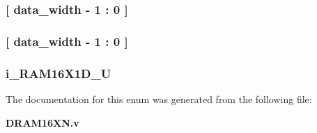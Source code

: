 \subsubsection[{O\-\_\-\-D\-A\-T\-A\-\_\-\-O\-U\-T\-\_\-\-D\-P}]{ {\bfseries \textcolor{vhdlchar}{[}\textcolor{vhdlchar}{ }{\bfseries {\bf data\-\_\-width}} \textcolor{vhdlchar}{-\/} \textcolor{vhdldigit}{1} \textcolor{vhdlchar}{ }\textcolor{vhdlchar}{\-:}\textcolor{vhdlchar}{ } \textcolor{vhdldigit}{0} \textcolor{vhdlchar}{ }\textcolor{vhdlchar}{]}\textcolor{vhdlchar}{ }} \hspace{0.3cm}}\label{enum1_d_r_a_m16_x_n_ad07ac2280a8fc60dfbb13bd438230070}
\subsubsection[{O\-\_\-\-D\-A\-T\-A\-\_\-\-O\-U\-T}]{ {\bfseries \textcolor{vhdlchar}{[}\textcolor{vhdlchar}{ }{\bfseries {\bf data\-\_\-width}} \textcolor{vhdlchar}{-\/} \textcolor{vhdldigit}{1} \textcolor{vhdlchar}{ }\textcolor{vhdlchar}{\-:}\textcolor{vhdlchar}{ } \textcolor{vhdldigit}{0} \textcolor{vhdlchar}{ }\textcolor{vhdlchar}{]}\textcolor{vhdlchar}{ }} \hspace{0.3cm}}\label{enum1_d_r_a_m16_x_n_ad31859e6845c2c658b3a03ebab00f031}
\subsubsection[{R\-A\-M16\-X1\-D}]{ {\bfseries \textcolor{vhdlchar}{i\-\_\-\-R\-A\-M16\-X1\-D\-\_\-\-U}\textcolor{vhdlchar}{ }} \hspace{0.3cm}}\label{enum1_d_r_a_m16_x_n_ad7afe4884c8f7d845c2926282d581be3}


The documentation for this enum was generated from the following file\-:\begin{DoxyCompactItemize}
\item 
{\bf D\-R\-A\-M16\-X\-N.\-v}\end{DoxyCompactItemize}
